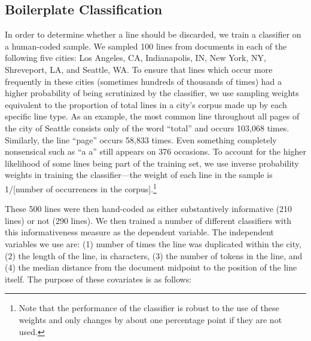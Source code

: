 \documentclass[11pt]{article}
\begin{document}
\subsection*{Boilerplate Classification}
In order to determine whether a line should be discarded, we train a classifier on a human-coded sample. We sampled 100 lines from documents in each of the following five cities: Los Angeles, CA, Indianapolis, IN, New York, NY, Shreveport, LA, and Seattle, WA. To ensure that lines which occur more frequently in these cities (sometimes hundreds of thousands of times) had a higher probability of being scrutinized by the classifier, we use sampling weights equivalent to the proportion of total lines in a city's corpus made up by each specific line type. As an example, the most common line throughout all pages of the city of Seattle consists only of the word ``total'' and occurs 103,068 times. Similarly, the line ``page'' occurs 58,833 times. Even something completely nonsensical such as ``a a'' still appears on 376 occasions. To account for the higher likelihood of some lines being part of the training set, we use inverse probability weights in training the classifier---the weight of each line in the sample is 1/[number of occurrences in the corpus].\footnote{Note that the performance of the classifier is robust to the use of these weights and only changes by about one percentage point if they are not used.}

These 500 lines were then hand-coded as either substantively informative (210 lines) or not (290 lines). We then trained a number of different classifiers with this informativeness measure as the dependent variable. The independent variables we use are: (1) number of times the line was duplicated within the city, (2) the length of the line, in characters, (3) the number of tokens in the line, and (4) the median distance from the document midpoint to the position of the line itself. The purpose of these covariates is as follows:
\end{document}
